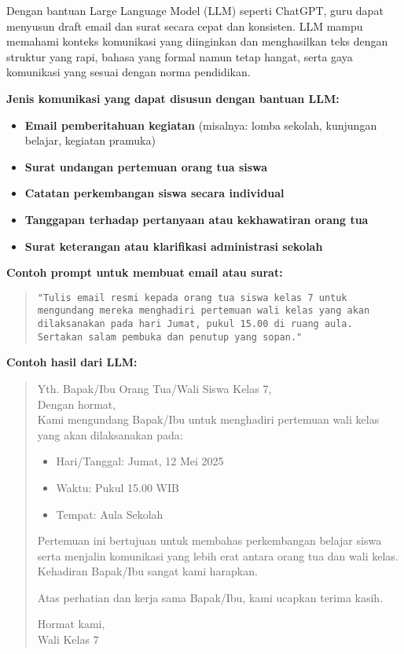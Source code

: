 Dengan bantuan Large Language Model (LLM) seperti ChatGPT, guru dapat menyusun draft email dan surat secara cepat dan konsisten. LLM mampu memahami konteks komunikasi yang diinginkan dan menghasilkan teks dengan struktur yang rapi, bahasa yang formal namun tetap hangat, serta gaya komunikasi yang sesuai dengan norma pendidikan.

\textbf{Jenis komunikasi yang dapat disusun dengan bantuan LLM:}
\begin{itemize}
	\item \textbf{Email pemberitahuan kegiatan} (misalnya: lomba sekolah, kunjungan belajar, kegiatan pramuka)
	\item \textbf{Surat undangan pertemuan orang tua siswa}
	\item \textbf{Catatan perkembangan siswa secara individual}
	\item \textbf{Tanggapan terhadap pertanyaan atau kekhawatiran orang tua}
	\item \textbf{Surat keterangan atau klarifikasi administrasi sekolah}
\end{itemize}

\textbf{Contoh prompt untuk membuat email atau surat:}

\begin{quote}
	\centering
	\texttt{"Tulis email resmi kepada orang tua siswa kelas 7 untuk mengundang mereka menghadiri pertemuan wali kelas yang akan dilaksanakan pada hari Jumat, pukul 15.00 di ruang aula. Sertakan salam pembuka dan penutup yang sopan."}
\end{quote}

\textbf{Contoh hasil dari LLM:}

\begin{quote}
	Yth. Bapak/Ibu Orang Tua/Wali Siswa Kelas 7,\\
	
	Dengan hormat,\\
	
	Kami mengundang Bapak/Ibu untuk menghadiri pertemuan wali kelas yang akan dilaksanakan pada:
	
	\begin{itemize}
		\item Hari/Tanggal: Jumat, 12 Mei 2025
		\item Waktu: Pukul 15.00 WIB
		\item Tempat: Aula Sekolah
	\end{itemize}
	
	Pertemuan ini bertujuan untuk membahas perkembangan belajar siswa serta menjalin komunikasi yang lebih erat antara orang tua dan wali kelas. Kehadiran Bapak/Ibu sangat kami harapkan.
	
	Atas perhatian dan kerja sama Bapak/Ibu, kami ucapkan terima kasih.
	
	Hormat kami,\\
	Wali Kelas 7
\end{quote}

